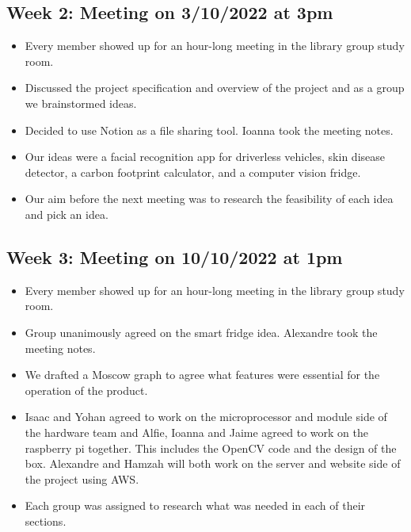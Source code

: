 \subsection{Week 2: Meeting on 3/10/2022 at 3pm}
\begin{itemize}
    \item Every member showed up for an hour-long meeting in the library group study room. 
    \item Discussed the project specification and overview of the project and as a group we brainstormed ideas. 
    \item Decided to use Notion as a file sharing tool. Ioanna took the meeting notes. 
    \item Our ideas were a facial recognition app for driverless vehicles, skin disease detector, a carbon footprint calculator, and a computer vision fridge. 
    \item Our aim before the next meeting was to research the feasibility of each idea and pick an idea. 
\end{itemize}

\subsection{Week 3: Meeting on 10/10/2022 at 1pm }
\begin{itemize}
    \item   Every member showed up for an hour-long meeting in the library group study room. 
    \item   Group unanimously agreed on the smart fridge idea. Alexandre took the meeting notes. 
    \item   We drafted a Moscow graph to agree what features were essential for the operation of the product. 
    \item   Isaac and Yohan agreed to work on the microprocessor and module side of the hardware team and Alfie, Ioanna and Jaime agreed to work on the raspberry pi together. This includes the OpenCV code and the design of the box. Alexandre and Hamzah will both work on the server and website side of the project using AWS. 
    \item   Each group was assigned to research what was needed in each of their sections.  
\end{itemize}

